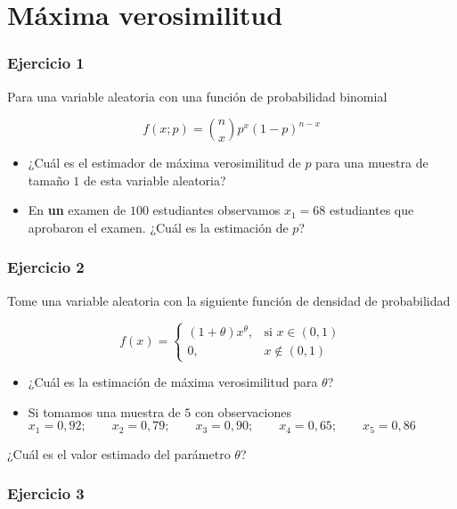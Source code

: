 \documentclass[
]{book}
\begin{document}
\hypertarget{muxe1xima-verosimilitud}{%
\section{Máxima verosimilitud}\label{muxe1xima-verosimilitud}}

\hypertarget{ejercicio-1-7}{%
\subsubsection{Ejercicio 1}\label{ejercicio-1-7}}

Para una variable aleatoria con una función de probabilidad binomial

\[f(x; p)=\binom n x p^x(1-p)^{n-x}\]

\begin{itemize}
\item
  ¿Cuál es el estimador de máxima verosimilitud de \(p\) para una muestra de tamaño \(1\) de esta variable aleatoria?
\item
  En \textbf{un} examen de \(100\) estudiantes observamos \(x_1=68\) estudiantes que aprobaron el examen. ¿Cuál es la estimación de \(p\)?
\end{itemize}

\hypertarget{ejercicio-2-7}{%
\subsubsection{Ejercicio 2}\label{ejercicio-2-7}}

Tome una variable aleatoria con la siguiente función de densidad de probabilidad

\[
f(x)=
\begin{cases}
    (1+\theta)x^\theta,& \text{si } x\in (0,1)\\
    0,&  x\notin (0,1)
\end{cases}
\]

\begin{itemize}
\item
  ¿Cuál es la estimación de máxima verosimilitud para \(\theta\)?
\item
  Si tomamos una muestra de \(5\) con observaciones
  \(x_1 = 0,92; \qquad x_2 = 0,79; \qquad x_3 = 0,90; \qquad x_4 = 0,65; \qquad x_5 = 0,86\)
\end{itemize}

¿Cuál es el valor estimado del parámetro \(\theta\)?

\hypertarget{ejercicio-3-4}{%
\subsubsection{Ejercicio 3}\label{ejercicio-3-4}}
\end{document}
